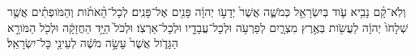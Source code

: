 \documentclass{openreader}
\begin{document}
וְלֹֽא־קָ֨ם נָבִ֥יא עֹ֛וד בְּיִשְׂרָאֵ֖ל כְּמֹשֶׁ֑ה אֲשֶׁר֙ יְדָעֹ֣ו יְהוָ֔ה פָּנִ֖ים אֶל־פָּנִֽים׃ 
לְכָל־הָ֨אֹתֹ֜ות וְהַמֹּופְתִ֗ים אֲשֶׁ֤ר שְׁלָחֹו֙ יְהוָ֔ה לַעֲשֹׂ֖ות בְּאֶ֣רֶץ מִצְרָ֑יִם לְפַרְעֹ֥ה וּלְכָל־עֲבָדָ֖יו וּלְכָל־אַרְצֹֽו׃ 
וּלְכֹל֙ הַיָּ֣ד הַחֲזָקָ֔ה וּלְכֹ֖ל הַמֹּורָ֣א הַגָּדֹ֑ול אֲשֶׁר֙ עָשָׂ֣ה מֹשֶׁ֔ה לְעֵינֵ֖י כָּל־יִשְׂרָאֵֽל׃ 
\end{document}

